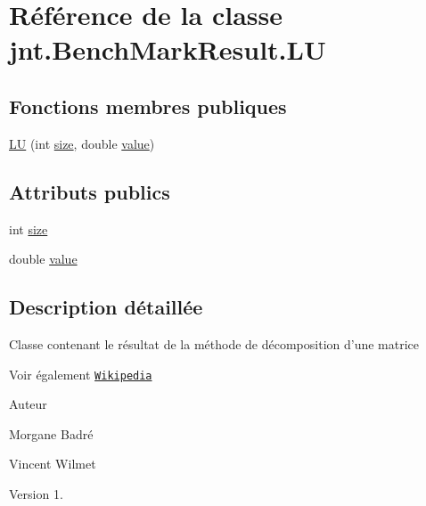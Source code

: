 \hypertarget{classjnt_1_1BenchMarkResult_1_1LU}{\section{Référence de la classe jnt.\-Bench\-Mark\-Result.\-L\-U}
\label{classjnt_1_1BenchMarkResult_1_1LU}
}
\subsection*{Fonctions membres publiques}
\begin{DoxyCompactItemize}
\item 
\hyperlink{classjnt_1_1BenchMarkResult_1_1LU_a970b49a9a9eb74f5717691eff796c551}{L\-U} (int \hyperlink{classjnt_1_1BenchMarkResult_1_1LU_a8d2cdf93e8ba8f6df167b053a825f11e}{size}, double \hyperlink{classjnt_1_1BenchMarkResult_1_1LU_a693d4e24e09e0d691349df30f4b36ff2}{value})
\end{DoxyCompactItemize}
\subsection*{Attributs publics}
\begin{DoxyCompactItemize}
\item 
int \hyperlink{classjnt_1_1BenchMarkResult_1_1LU_a8d2cdf93e8ba8f6df167b053a825f11e}{size}
\item 
double \hyperlink{classjnt_1_1BenchMarkResult_1_1LU_a693d4e24e09e0d691349df30f4b36ff2}{value}
\end{DoxyCompactItemize}


\subsection{Description détaillée}
Classe contenant le résultat de la méthode de décomposition d'une matrice \begin{DoxySeeAlso}{Voir également}
\href{http://fr.wikipedia.org/wiki/D%C3%A9composition_LU}{\tt Wikipedia} 
\end{DoxySeeAlso}
\begin{DoxyAuthor}{Auteur}

\begin{DoxyItemize}
\item Morgane Badré 
\item Vincent Wilmet 
\end{DoxyItemize}
\end{DoxyAuthor}
\begin{DoxyVersion}{Version}
1. 
\end{DoxyVersion}


